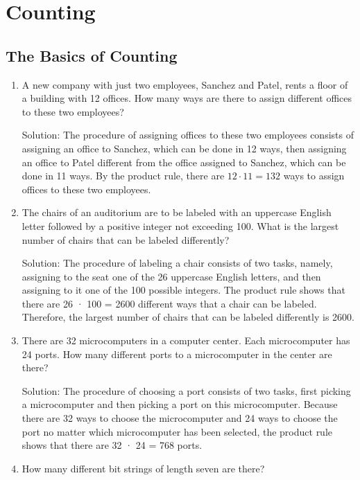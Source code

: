 \documentclass[11pt,a4paper]{book}
\begin{document}
\setcounter{chapter}{5}
\chapter{Counting}
\section{The Basics of Counting}
\begin{enumerate}[label=Example~\arabic*]
\item A new company with just two employees, Sanchez and Patel, rents a floor of a building with 12 offices. How many ways are there to assign different offices to these two employees?

Solution: The procedure of assigning offices to these two employees consists of assigning an office to Sanchez, which can be done in 12 ways, then assigning an office to Patel different from the office assigned to Sanchez, which can be done in 11 ways.
By the product rule, there are $12 \cdot 11 = 132$ ways to assign offices to these two employees.

\item The chairs of an auditorium are to be labeled with an uppercase English letter followed by a positive integer not exceeding 100. What is the largest number of chairs that can be labeled differently?

Solution: The procedure of labeling a chair consists of two tasks, namely, assigning to the seat one of the 26 uppercase English letters, and then assigning to it one of the 100 possible integers.
The product rule shows that there are 26 · 100 = 2600 different ways that a chair can be labeled.
Therefore, the largest number of chairs that can be labeled differently is 2600.

\item There are 32 microcomputers in a computer center. Each microcomputer has 24 ports.
How many different ports to a microcomputer in the center are there?

Solution: The procedure of choosing a port consists of two tasks, first picking a microcomputer and then picking a port on this microcomputer.
Because there are 32 ways to choose the microcomputer and 24 ways to choose the port no matter which microcomputer has been selected, the product rule shows that there are 32 · 24 = 768 ports.

\item How many different bit strings of length seven are there?


\end{enumerate}
\end{document}
